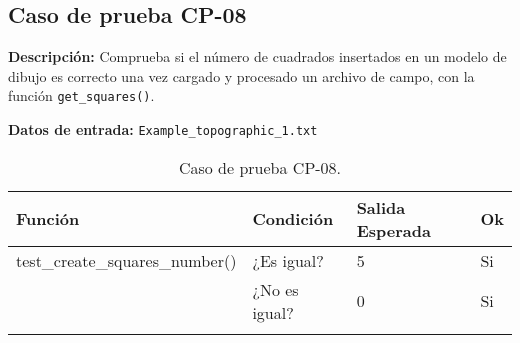 \subsection{Caso de prueba CP-08}

\textbf{Descripción:} Comprueba si el número de cuadrados insertados en un modelo de dibujo es correcto una vez cargado y procesado un archivo de campo, con la función \texttt{get\_squares()}.

\textbf{Datos de entrada:} \texttt{Example\_topographic\_1.txt}


\begin{longtable}[]{@{}llll@{}}
\toprule
\begin{minipage}[b]{0.6\columnwidth}\raggedright\strut
Función\strut
\end{minipage} & \begin{minipage}[b]{0.20\columnwidth}\raggedright\strut
Condición\strut
\end{minipage} & \begin{minipage}[b]{0.15\columnwidth}\raggedright\strut
Salida Esperada\strut
\end{minipage} & \begin{minipage}[b]{0.05\columnwidth}\raggedright\strut
Ok\strut
\end{minipage}\tabularnewline
\midrule
\endhead
\begin{minipage}[t]{0.6\columnwidth}\raggedright\strut
test\_create\_squares\_number()\strut
\end{minipage} & \begin{minipage}[t]{0.20\columnwidth}\raggedright\strut
¿Es igual?\strut
\end{minipage} & \begin{minipage}[t]{0.15\columnwidth}\raggedright\strut
5\strut
\end{minipage} & \begin{minipage}[t]{0.05\columnwidth}\raggedright\strut
Si\strut
\end{minipage}\tabularnewline
\begin{minipage}[t]{0.6\columnwidth}\raggedright\strut
\strut
\end{minipage} & \begin{minipage}[t]{0.20\columnwidth}\raggedright\strut
¿No es igual?\strut
\end{minipage} & \begin{minipage}[t]{0.15\columnwidth}\raggedright\strut
0\strut
\end{minipage} & \begin{minipage}[t]{0.05\columnwidth}\raggedright\strut
Si\strut
\end{minipage}\tabularnewline

\bottomrule
\caption{Caso de prueba CP-08.}
\end{longtable}

